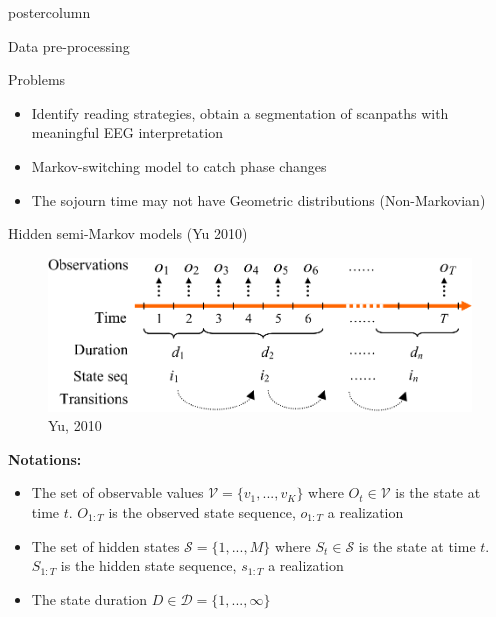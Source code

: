 \documentclass[final,hyperref={pdfpagelabels=false}]{beamer}
\begin{document}
\begin{frame}
\begin{columns}
\begin{column}{.50\textwidth}
\begin{beamercolorbox}[center,wd=\textwidth]{postercolumn}
\begin{minipage}[T]{.98\textwidth}
{\begin{block}{Data pre-processing}
            \end{block}
            \vfill
            \begin{block}{Problems}
                \begin{itemize}
                    \item[\bullet] Identify reading strategies, obtain a segmentation of scanpaths with meaningful EEG interpretation
                    \item[\bullet] Markov-switching model to catch phase changes
                    \item[\bullet] The sojourn time may not have Geometric distributions (Non-Markovian)
                \end{itemize}
            \end{block}
            \vfill
            \begin{block}{Hidden semi-Markov models (Yu 2010)}
                \begin{figure}[H]
                    \includegraphics[width=.60\linewidth]{hsmm_representation.png}
                    \caption{Yu, 2010}
                \end{figure}
                \vskip-2cm
                \textbf{Notations:}
                \begin{itemize}
                    \item[\bullet] The set of observable values $\mathcal{V} = \{ v_1,..., v_K\}$
                    where $O_t \in \mathcal{V}$ is the state at time $t$. $O_{1:T}$ is the observed state sequence,
                    $o_{1:T}$ a realization
                    \item[\bullet] The set of hidden states $\mathcal{S}=\{1,...,M\}$
                    where $S_t \in \mathcal{S}$ is the state at time $t$. $S_{1:T}$ is the hidden state sequence,
                    $s_{1:T}$ a realization
                    \item[\bullet] The state duration $D \in \mathcal{D}=\{1,...,\infty\}$
                \end{itemize}


\end{block}}
\end{minipage}
\end{beamercolorbox}
\end{column}
\end{columns}
\end{frame}
\end{document}
